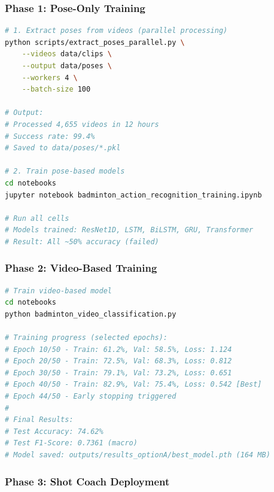 \documentclass[11pt,a4paper]{article}
\begin{document}
\subsubsection{Phase 1: Pose-Only Training}

\begin{lstlisting}[language=bash, caption=Extract Poses and Train Models]
# 1. Extract poses from videos (parallel processing)
python scripts/extract_poses_parallel.py \
    --videos data/clips \
    --output data/poses \
    --workers 4 \
    --batch-size 100

# Output:
# Processed 4,655 videos in 12 hours
# Success rate: 99.4%
# Saved to data/poses/*.pkl

# 2. Train pose-based models
cd notebooks
jupyter notebook badminton_action_recognition_training.ipynb

# Run all cells
# Models trained: ResNet1D, LSTM, BiLSTM, GRU, Transformer
# Result: All ~50% accuracy (failed)
\end{lstlisting}

\subsubsection{Phase 2: Video-Based Training}

\begin{lstlisting}[language=bash, caption=Train ResNet18+BiLSTM on Videos]
# Train video-based model
cd notebooks
python badminton_video_classification.py

# Training progress (selected epochs):
# Epoch 10/50 - Train: 61.2%, Val: 58.5%, Loss: 1.124
# Epoch 20/50 - Train: 72.5%, Val: 68.3%, Loss: 0.812
# Epoch 30/50 - Train: 79.1%, Val: 73.2%, Loss: 0.651
# Epoch 40/50 - Train: 82.9%, Val: 75.4%, Loss: 0.542 [Best]
# Epoch 44/50 - Early stopping triggered
#
# Final Results:
# Test Accuracy: 74.62%
# Test F1-Score: 0.7361 (macro)
# Model saved: outputs/results_optionA/best_model.pth (164 MB)
\end{lstlisting}

\subsubsection{Phase 3: Shot Coach Deployment}
\end{document}
